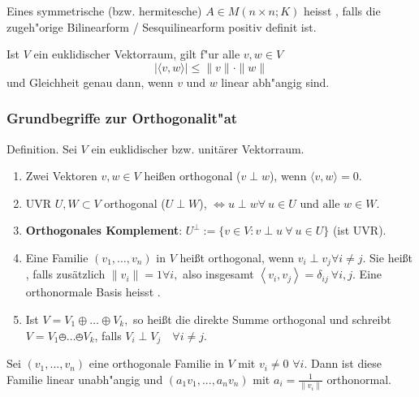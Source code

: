 \documentclass[8pt, a4paper, twocolumn, landscape]{article}
\begin{document}
\begin{remark}
Eines symmetrische (bzw. hermitesche)  $A \in M( n \times n; K)$ heisst , falls die zugeh"orige Bilinearform / Sesquilinearform positiv definit ist. 
\end{remark}

\begin{theorem}  Ist $V$ ein euklidischer Vektorraum, gilt f"ur alle $v, w \in V$
\begin{equation*}
|\langle v, w\rangle| \leq\|v\| \cdot\|w\|
\end{equation*}
und Gleichheit genau dann, wenn $v$ und $w$ linear abh"angig sind.
\end{theorem}

\subsubsection{Grundbegriffe zur Orthogonalit"at}
\begin{definition}
Definition. Sei \(V\) ein euklidischer bzw. unitärer Vektorraum.
\begin{enumerate}
\item Zwei Vektoren \(v, w \in V\) heißen orthogonal ($v \perp w$), wenn $\langle v, w\rangle= 0.$
\item UVR \(U, W \subset V\) orthogonal ($U \perp W$), $\Leftrightarrow
u \perp w \forall \ u \in U \text { und alle } w \in W \text {. }$
\item \textbf{Orthogonales Komplement}:
$U^{\perp}:=\{v \in V: v \perp u \ \forall \  u \in U\}$ (ist UVR).
\item Eine Familie \(\left(v_{1}, \ldots, v_{n}\right)\) in \(V\) heißt orthogonal, wenn
$v_{i} \perp v_{j} \forall i \neq j.$
Sie heißt , falls zusätzlich $
\|v_i\| = 1 \forall i,
$ also insgesamt $\left\langle v_{i}, v_{j}\right\rangle=\delta_{i j} \ \forall i, j.$
Eine orthonormale Basis heisst .
\item Ist \(V=V_{1} \oplus \ldots \oplus V_{k},\) so heißt die direkte Summe orthogonal und schreibt $V=V_{1} \obot \ldots \obot V_{k}$, falls
$V_{i} \perp V_{j} \quad \forall i \neq j.$
\end{enumerate}
\end{definition}

\begin{remark}
Sei $(v_1, ..., v_n)$ eine orthogonale Familie in $V$ mit $v_i \neq 0$ $\forall i$. Dann ist diese Familie linear unabh"angig und $(a_1 v_1, ..., a_n v_n)$ mit $a_i = \frac{1}{\|v_i\|}$ orthonormal.
\end{remark}
\end{document}
